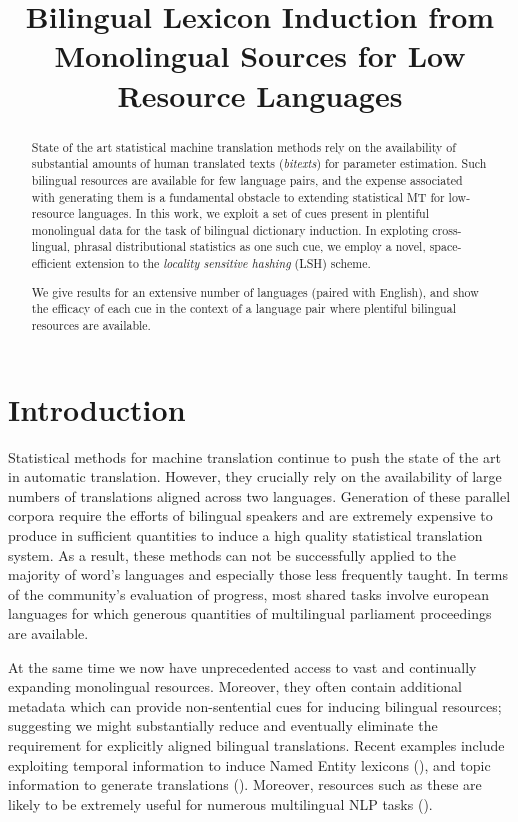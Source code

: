 \documentclass[11pt]{article}
\title{Bilingual Lexicon Induction from Monolingual Sources for Low Resource Languages}
\date{}
\newcommand{\mnote}[1]{\marginpar{%
  \vskip-\baselineskip
  \raggedright\footnotesize
  \itshape\hrule\smallskip\tiny{#1}\par\smallskip\hrule}}
\newcommand{\mtodo}[1]{\mnote{\textcolor{red}{#1}}}
\begin{document}
\maketitle
\begin{abstract}
State of the art statistical machine translation methods rely on the
availability of substantial amounts of human translated texts (\emph{bitexts})
for parameter estimation. Such bilingual resources are available for few
language pairs, and the expense associated with generating them is a fundamental
obstacle to extending statistical MT for low-resource languages. In this work,
we exploit a set of cues present in plentiful monolingual data for the task of
bilingual dictionary induction. In exploting cross-lingual, phrasal
distributional statistics as one such cue, we employ a novel, space-efficient
extension to the \emph{locality sensitive hashing} (LSH) scheme.

We give results for an extensive number of languages (paired with English), and
show the efficacy of each cue in the context of a language pair where plentiful
bilingual resources are available.

\end{abstract}

\section{Introduction} \label{sect:intro}


Statistical methods for machine translation continue to push the state of the
art in automatic translation. However, they crucially rely on the availability
of large numbers of translations aligned across two languages. Generation of
these parallel corpora require the efforts of bilingual speakers and are
extremely expensive to produce in sufficient quantities to induce a high quality
statistical translation system. As a result, these methods can not be
successfully applied to the majority of word's languages and especially those
less frequently taught. In terms of the community's evaluation of progress, most
shared tasks involve european languages for which generous quantities of
multilingual parliament proceedings are available.

At the same time we now have unprecedented access to vast and continually
expanding monolingual resources. Moreover, they often contain additional
metadata which can provide non-sentential cues for inducing bilingual resources;
suggesting we might substantially reduce and eventually eliminate the
requirement for explicitly aligned bilingual translations. Recent examples
include exploiting temporal information to induce Named Entity lexicons
(\cite{Alex, David}), and topic information to generate translations
(\cite{Mimno}). Moreover, resources such as these are likely to be extremely
useful for numerous multilingual NLP tasks (\mtodo{Examples}).
\end{document}
